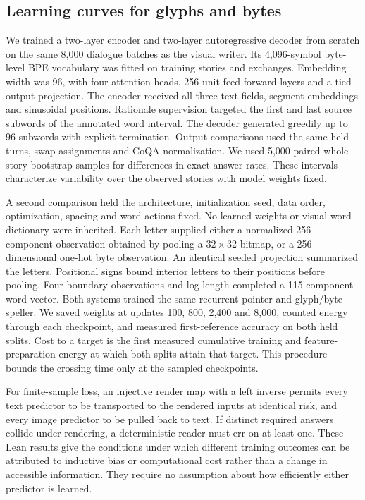\documentclass[12pt,a4paper]{article}
\providecommand{\DIFadd}[1]{{\protect\color{blue} \sf #1}} %
\begin{document}
\subsection*{\DIFadd{Learning curves for glyphs and bytes}}
\DIFadd{We trained a two-layer encoder and two-layer autoregressive decoder from scratch on the same 8,000 dialogue batches as the visual writer. Its 4,096-symbol byte-level BPE vocabulary was fitted on training stories and exchanges. Embedding width was 96, with four attention heads, 256-unit feed-forward layers and a tied output projection. The encoder received all three text fields, segment embeddings and sinusoidal positions. Rationale supervision targeted the first and last source subwords of the annotated word interval. The decoder generated greedily up to 96 subwords with explicit termination. Output comparisons used the same held turns, swap assignments and CoQA normalization. We used 5,000 paired whole-story bootstrap samples for differences in exact-answer rates. These intervals characterize variability over the observed stories with model weights fixed.
}

\DIFadd{A second comparison held the architecture, initialization seed, data order, optimization, spacing and word actions fixed. No learned weights or visual word dictionary were inherited. Each letter supplied either a normalized 256-component observation obtained by pooling a $32\times32$ bitmap, or a 256-dimensional one-hot byte observation. An identical seeded projection summarized the letters. Positional signs bound interior letters to their positions before pooling. Four boundary observations and log length completed a 115-component word vector. Both systems trained the same recurrent pointer and glyph/byte speller. We saved weights at updates 100, 800, 2,400 and 8,000, counted energy through each checkpoint, and measured first-reference accuracy on both held splits. Cost to a target is the first measured cumulative training and feature-preparation energy at which both splits attain that target. This procedure bounds the crossing time only at the sampled checkpoints.
}

\DIFadd{For finite-sample loss, an injective render map with a left inverse permits every text predictor to be transported to the rendered inputs at identical risk, and every image predictor to be pulled back to text. If distinct required answers collide under rendering, a deterministic reader must err on at least one. These Lean results give the conditions under which different training outcomes can be attributed to inductive bias or computational cost rather than a change in accessible information. They require no assumption about how efficiently either predictor is learned.
}
\end{document}
